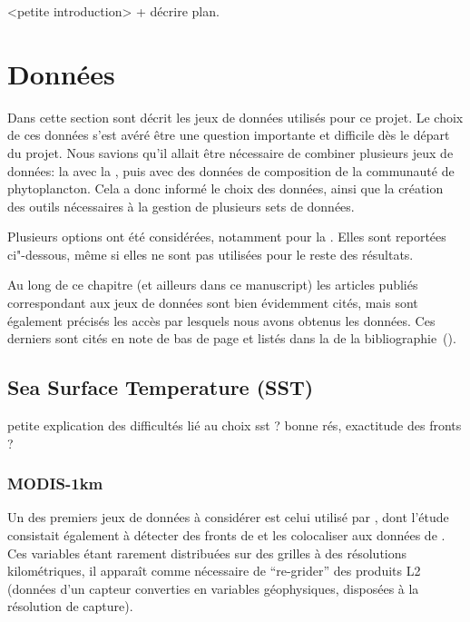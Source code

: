 
\label{chp:methodes}

\minitoc%
\clearpage

<petite introduction>
 + décrire plan.

\section{Données}
\label{sec:donnees}

Dans cette section sont décrit les jeux de données utilisés pour ce projet.
Le choix de ces données s'est avéré être une question importante et difficile dès le départ du projet.
Nous savions qu'il allait être nécessaire de combiner plusieurs jeux de données: la  avec la , puis avec des données de composition de la communauté de phytoplancton.
Cela a donc informé le choix des données, ainsi que la création des outils nécessaires à la gestion de plusieurs sets de données.

Plusieurs options ont été considérées, notamment pour la .
Elles sont reportées ci"-dessous, même si elles ne sont pas utilisées pour le reste des résultats.

Au long de ce chapitre (et ailleurs dans ce manuscript) les articles publiés correspondant aux jeux de données sont bien évidemment cités, mais sont également précisés les accès par lesquels nous avons obtenus les données.
Ces derniers sont cités en note de bas de page et listés dans la  de la bibliographie~().

\subsection{Sea Surface Temperature (SST)}
\label{sec:donnees-sst}

petite explication des difficultés lié au choix sst ?
bonne rés, exactitude des fronts ?

\subsubsection{MODIS-1km}

Un des premiers jeux de données  à considérer est celui utilisé par \textcite{liu_2016}, dont l'étude consistait également à détecter des fronts de  et les colocaliser aux données de .
Ces variables étant rarement distribuées sur des grilles à des résolutions kilométriques, il apparaît comme nécessaire de \enquote{re-grider} des produits L2 (données d'un capteur converties en variables géophysiques, disposées à la résolution de capture).


